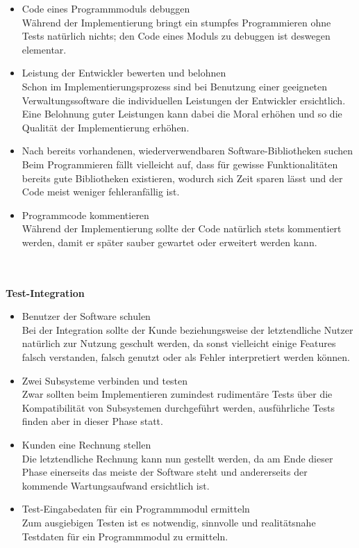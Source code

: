 \documentclass[a4paper,graphics,11pt]{article}
\begin{document}
\begin{itemize}
\item Code eines Programmmoduls debuggen\\
Während der Implementierung bringt ein stumpfes Programmieren ohne Tests natürlich nichts; den Code eines Moduls zu debuggen ist deswegen elementar.
\item Leistung der Entwickler bewerten und belohnen\\
Schon im Implementierungsprozess sind bei Benutzung einer geeigneten Verwaltungssoftware die individuellen Leistungen der Entwickler ersichtlich. Eine Belohnung guter
Leistungen kann dabei die Moral erhöhen und so die Qualität der Implementierung erhöhen.
\item Nach bereits vorhandenen, wiederverwendbaren Software-Bibliotheken suchen\\
Beim Programmieren fällt vielleicht auf, dass für gewisse Funktionalitäten bereits gute Bibliotheken existieren, wodurch sich Zeit sparen lässt und der Code meist weniger
fehleranfällig ist.
\item Programmcode kommentieren \\
Während der Implementierung sollte der Code natürlich stets kommentiert werden, damit er später sauber gewartet oder erweitert werden kann.
\end{itemize} \ \\ \ \\
\textbf{Test-Integration}
\begin{itemize}
\item Benutzer der Software schulen\\
Bei der Integration sollte der Kunde beziehungsweise der letztendliche Nutzer natürlich zur Nutzung geschult werden, da sonst vielleicht einige Features falsch
verstanden, falsch genutzt oder als Fehler interpretiert werden können.
\item Zwei Subsysteme verbinden und testen\\
Zwar sollten beim Implementieren zumindest rudimentäre Tests über die Kompatibilität von Subsystemen durchgeführt werden, ausführliche Tests finden aber in dieser
Phase statt. 
\item Kunden eine Rechnung stellen \\
Die letztendliche Rechnung kann nun gestellt werden, da am Ende dieser Phase einerseits das meiste der Software steht und andererseits der kommende Wartungsaufwand ersichtlich ist.
\item Test-Eingabedaten für ein Programmmodul ermitteln\\
Zum ausgiebigen Testen ist es notwendig, sinnvolle und realitätsnahe Testdaten für ein Programmmodul zu ermitteln.
\end{itemize} \ \\ \ \\
\end{document}
